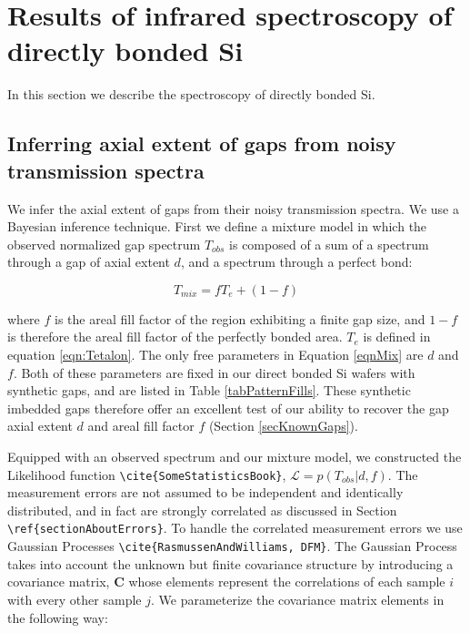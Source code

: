 \documentclass[osajnl,preprint,showpacs,superscriptaddress,12pt]{revtex4-1} %
\begin{document}
\section{Results of infrared spectroscopy of directly bonded Si}
\label{secResults}
In this section we describe the spectroscopy of directly bonded Si.




\subsection{Inferring axial extent of gaps from noisy transmission spectra}
We infer the axial extent of gaps from their noisy transmission spectra.  We use a Bayesian inference technique.  First we define a mixture model in which the observed normalized gap spectrum $T_{obs}$ is composed of a sum of a spectrum through a gap of axial extent $d$, and a spectrum through a perfect bond:

\begin{equation}
	T_{mix} = f T_{e} + (1-f) \label{eqnMix}
\end{equation}

where $f$ is the areal fill factor of the region exhibiting a finite gap size, and $1-f$ is therefore the areal fill factor of the perfectly bonded area.  $T_e$ is defined in equation \ref{eqn:Tetalon}.  The only free parameters in Equation \ref{eqnMix} are $d$ and $f$.  Both of these parameters are fixed in our direct bonded Si wafers with synthetic gaps, and are listed in Table \ref{tabPatternFills}.  These synthetic imbedded gaps therefore offer an excellent test of our ability to recover the gap axial extent $d$ and areal fill factor $f$ (Section \ref{secKnownGaps}).

Equipped with an observed spectrum and our mixture model, we constructed the Likelihood function \verb|\cite{SomeStatisticsBook}|, $\mathcal{L} = p(T_{obs} | d, f)$.  The measurement errors are not assumed to be independent and identically distributed, and in fact are strongly correlated as discussed in Section \verb|\ref{sectionAboutErrors}|.  To handle the correlated measurement errors we use Gaussian Processes \verb|\cite{RasmussenAndWilliams, DFM}|.  The Gaussian Process takes into account the unknown but finite covariance structure by introducing a covariance matrix, $\boldsymbol{C}$ whose elements represent the correlations of each sample $i$ with every other sample $j$.  We parameterize the covariance matrix elements in the following way:
\end{document}
